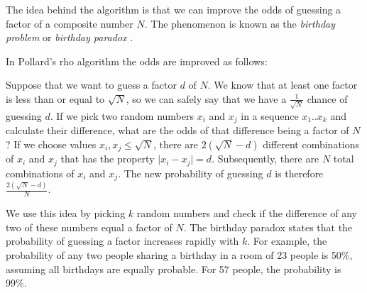 \documentclass[paper=a4, fontsize=11pt,numbers=endperiod]{scrartcl} %
\providecommand{\abs}[1]{\lvert#1\rvert} %
\numberwithin{equation}{section} %
\numberwithin{figure}{section} %
\numberwithin{table}{section} %
\begin{document}
The idea behind the algorithm is that we can improve the odds of guessing a factor of a composite number $N$.
The phenomenon is known as the \emph{birthday problem} or \emph{birthday paradox} \cite{birthday}.

In Pollard's rho algorithm the odds are improved as follows:

Suppose that we want to guess a factor $d$ of $N$.
We know that at least one factor is less than or equal to $\sqrt{N}$, so we can safely say that we have a $\frac{1}{\sqrt{N}}$ chance of guessing $d$.
If we pick two random numbers $x_i$ and $x_j$ in a sequence $x_1 .. x_k$ and calculate their difference, what are the odds of that difference being a factor of $N$?
If we choose values $x_i, x_j \leq \sqrt{N}$, there are $2(\sqrt{N}-d)$ different combinations of $x_i$ and $x_j$ that has the property $\abs{x_i - x_j} = d$. %
Subsequently, there are $N$ total combinations of $x_i$ and $x_j$.
The new probability of guessing $d$ is therefore $\frac{2(\sqrt{N}-d)}{N}$. \cite{colorado}

We use this idea by picking $k$ random numbers and check if the difference of any two of these numbers equal a factor of $N$.
The birthday paradox states that the probability of guessing a factor increases rapidly with $k$.
For example, the probability of any two people sharing a birthday in a room of 23 people is 50\%, assuming all birthdays are equally probable.
For 57 people, the probability is 99\%.
\end{document}
